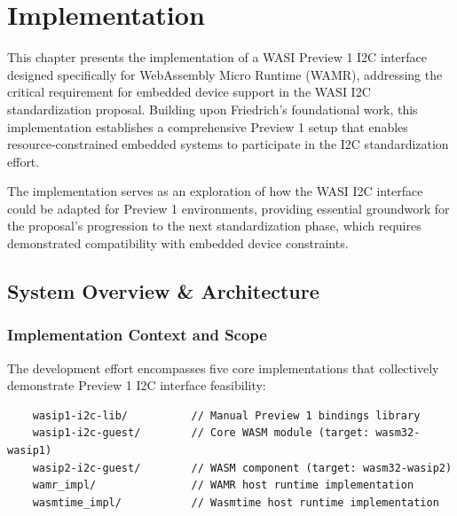 \chapter{Implementation}
\label{chap:implementation}

This chapter presents the implementation of a WASI Preview 1 I2C interface designed specifically for WebAssembly Micro Runtime (WAMR), addressing the critical requirement for embedded device support in the WASI I2C standardization proposal. Building upon Friedrich's foundational work, this implementation establishes a comprehensive Preview 1 setup that enables resource-constrained embedded systems to participate in the I2C standardization effort.

The implementation serves as an exploration of how the WASI I2C interface could be adapted for Preview 1 environments, providing essential groundwork for the proposal's progression to the next standardization phase, which requires demonstrated compatibility with embedded device constraints.

\section{System Overview \& Architecture}
\label{sec:system-overview}

\subsection{Implementation Context and Scope}

The development effort encompasses five core implementations that collectively demonstrate Preview 1 I2C interface feasibility:

\begin{verbatim}
    wasip1-i2c-lib/          // Manual Preview 1 bindings library
    wasip1-i2c-guest/        // Core WASM module (target: wasm32-wasip1)
    wasip2-i2c-guest/        // WASM component (target: wasm32-wasip2)
    wamr_impl/               // WAMR host runtime implementation
    wasmtime_impl/           // Wasmtime host runtime implementation
\end{verbatim}

